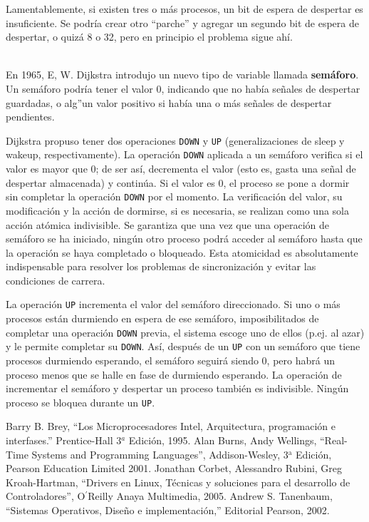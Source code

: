 \documentclass{article}
\begin{document}
Lamentablemente, si existen tres o m\'as procesos, un bit de espera de 
despertar es insuficiente. Se podr\'ia crear otro ``parche'' y agregar 
un segundo bit de espera de despertar, o quiz\'a 8 o 32, pero en 
principio el problema sigue ah\'i.

\\
En 1965, E, W. Dijkstra introdujo un nuevo tipo de variable llamada 
{\bf sem\'aforo}. Un sem\'aforo podr\'ia tener el valor 0, indicando 
que no hab\'ia se\~nales de despertar guardadas, o alg''un valor positivo 
si hab\'ia una o m\'as se\~nales de despertar pendientes. 

Dijkstra propuso tener dos operaciones {\tt DOWN} y {\tt UP} 
(generalizaciones de sleep y wakeup, respectivamente). La operaci\'on 
{\tt DOWN} aplicada a un sem\'aforo verifica si el valor es mayor que 
0; de ser as\'i, decrementa el valor (esto es, gasta una se\~nal de 
despertar almacenada) y contin\'ua. Si el valor es 0, el proceso se 
pone a dormir sin completar la operaci\'on {\tt DOWN} por el momento. 
La verificaci\'on del valor, su modificaci\'on y la acci\'on de dormirse,  
si es necesaria, se realizan como una sola {acci\'on at\'omica} indivisible. 
Se garantiza que una vez que una operaci\'on de sem\'aforo se ha iniciado, 
ning\'un otro proceso podr\'a acceder al sem\'aforo hasta que la operaci\'on 
se haya completado o bloqueado. Esta atomicidad es absolutamente indispensable 
para resolver los problemas de sincronizaci\'on y evitar las condiciones de 
carrera.

La operaci\'on {\tt UP} incrementa el valor del sem\'aforo direccionado. Si uno 
o m\'as procesos est\'an durmiendo en espera de ese sem\'aforo, imposibilitados 
de completar una operaci\'on {\tt DOWN} previa, el sistema escoge uno de 
ellos (p.ej. al azar) y le permite completar su {\tt DOWN}. As\'i, despu\'es de 
un {\tt UP} con un sem\'aforo que tiene procesos durmiendo esperando, el 
sem\'aforo seguir\'a siendo 0, pero habr\'a un proceso menos que se halle 
en fase de durmiendo esperando. La operaci\'on de incrementar el sem\'aforo 
y despertar un proceso tambi\'en es indivisible. Ning\'un proceso se bloquea 
durante un {\tt UP}.


\eject
\begin{thebibliography}{9}
Barry B. Brey, ``Los Microprocesadores Intel, 
Arquitectura, programaci\'on e interfases.'' Prentice-Hall 
3$^{a}$ Edici\'on, 1995.
Alan Burns, Andy Wellings, ``Real-Time Systems and 
Programming Languages'', Addison-Wesley, 3$^{\mbox{a}}$ Edici\'on, 
Pearson Education Limited 2001.
Jonathan Corbet, Alessandro Rubini, Greg Kroah-Hartman, 
``Drivers en Linux, T\'ecnicas y soluciones para el desarrollo de 
Controladores'', O$^{\prime}$Reilly Anaya Multimedia, 2005.
Andrew S. Tanenbaum, ``Sistemas Operativos, 
Dise\~no e implementaci\'on,'' Editorial Pearson, 2002.
\end{thebibliography}
\end{document}
